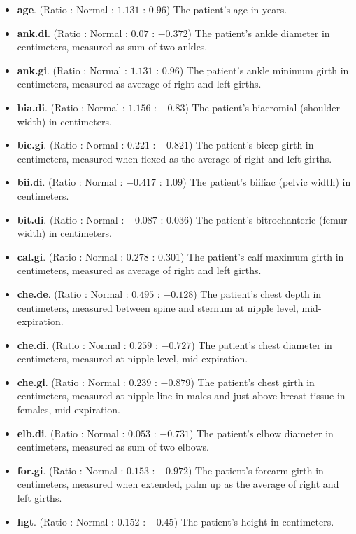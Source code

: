 \begin{itemize}
  \item \textbf{age}. (Ratio : Normal : $ 1.131 $ : $ 0.96 $) The patient's age in years.  
  \item \textbf{ank.di}. (Ratio : Normal : $ 0.07 $ : $ -0.372 $) The patient's ankle diameter in centimeters, measured as sum of two ankles.
  \item \textbf{ank.gi}. (Ratio : Normal : $ 1.131 $ : $ 0.96 $) The patient's ankle minimum girth in centimeters, measured as average of right and left girths.  
  \item \textbf{bia.di}. (Ratio : Normal : $ 1.156 $ : $ -0.83 $) The patient's biacromial (shoulder width) in centimeters.
  \item \textbf{bic.gi}. (Ratio : Normal : $ 0.221 $ : $ -0.821 $) The patient's bicep girth in centimeters, measured when flexed as the average of right and left girths.
  \item \textbf{bii.di}. (Ratio : Normal : $ -0.417 $ : $ 1.09 $) The patient's biiliac (pelvic width) in centimeters.
  \item \textbf{bit.di}. (Ratio : Normal : $ -0.087 $ : $ 0.036 $) The patient's bitrochanteric (femur width) in centimeters.
  \item \textbf{cal.gi}. (Ratio : Normal : $ 0.278 $ : $ 0.301 $) The patient's calf maximum girth in centimeters, measured as average of right and left girths.  
  \item \textbf{che.de}. (Ratio : Normal : $ 0.495 $ : $ -0.128 $) The patient's chest depth in centimeters, measured between spine and sternum at nipple level, mid-expiration.
  \item \textbf{che.di}. (Ratio : Normal : $ 0.259 $ : $ -0.727 $) The patient's chest diameter in centimeters, measured at nipple level, mid-expiration.
  \item \textbf{che.gi}. (Ratio : Normal : $ 0.239 $ : $ -0.879 $) The patient's chest girth in centimeters, measured at nipple line in males and just above breast tissue in females, mid-expiration.
  \item \textbf{elb.di}. (Ratio : Normal : $ 0.053 $ : $ -0.731 $) The patient's elbow diameter in centimeters, measured as sum of two elbows.
  \item \textbf{for.gi}. (Ratio : Normal : $ 0.153 $ : $ -0.972 $) The patient's forearm girth in centimeters, measured when extended, palm up as the average of right and left girths.
  \item \textbf{hgt}. (Ratio : Normal : $ 0.152 $ : $ -0.45 $) The patient's height in centimeters.

\end{itemize}
